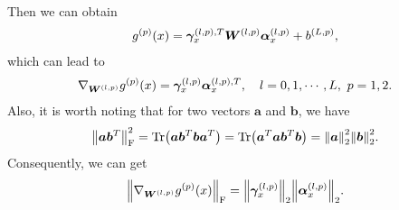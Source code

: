 Then we can obtain
\begin{align*}
  g^{(p)}(x)=\bm{\gamma}^{(l,p),T}_{x}\bm{W}^{(l,p)}{\bm{\alpha}}^{(l,p)}_{x}+b^{(L,p)},
\end{align*}
which can lead to
\begin{align}
  \label{eq:GradientExpr}
  \nabla_{\bm{W}^{(l,p)}} g^{(p)}(x)=\bm{\gamma}^{(l,p)}_{x}{\bm{\alpha}}^{(l,p),T}_{x},\quad l=0,1,\cdots,L,~p=1,2.
\end{align}
Also, it is worth noting that for two vectors $\bm{a}$ and $\bm{b}$, we have
\begin{align*}
  \norm{\bm{a} \bm{b}^T}_{\mathrm{F}}^2 = \Tr(\bm{a} \bm{b}^T \bm{b} \bm{a}^T) = \Tr(\bm{a}^T \bm{a} \bm{b}^T \bm{b}) = \norm{\bm{a}}_2^2 \norm{\bm{b}}_2^2.
\end{align*}
Consequently, we can get
\begin{align}
  \label{eq:GradientExpr_Fnorm}
  \norm{\nabla_{\bm{W}^{(l,p)}} g^{(p)}(x)}_{\mathrm{F}}=\norm{\bm{\gamma}^{(l,p)}_{x}}_2\norm{{\bm{\alpha}}^{(l,p)}_{x}}_2.
\end{align}





